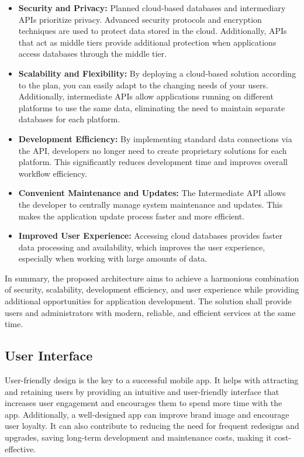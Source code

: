 \begin{itemize}
	\item \textbf{Security and Privacy:} Planned cloud-based databases and intermediary APIs prioritize privacy. Advanced security protocols and encryption techniques are used to protect data stored in the cloud. Additionally, APIs that act as middle tiers provide additional protection when applications access databases through the middle tier.
	
	\item \textbf{Scalability and Flexibility:} By deploying a cloud-based solution according to the  plan, you can easily adapt to the changing needs of your users.
	Additionally,  intermediate APIs allow applications running on different platforms to use the same data, eliminating the need to maintain separate databases for each platform.
	
	\item \textbf{Development Efficiency:} By implementing standard data connections via the  API,  developers no longer need to create proprietary solutions for each platform.
	This significantly reduces development time and improves overall workflow efficiency.
	
	\item \textbf{Convenient Maintenance and Updates:} The Intermediate API allows the developer to centrally manage system maintenance and updates. This makes the application update process faster and more efficient.
	
	\item \textbf{Improved User Experience:} Accessing cloud databases provides faster data processing and availability, which improves the user experience, especially when working with large amounts of data.
\end{itemize}
 
In summary, the proposed architecture aims to achieve a harmonious combination of security, scalability, development efficiency, and user experience while providing additional opportunities for application development. The solution shall provide users and administrators with modern, reliable, and efficient services at the same time.

\subsection{User Interface}

User-friendly design is the key to a successful mobile app. It helps with attracting and retaining users by providing an intuitive and user-friendly interface that increases user engagement and encourages them to spend more time with the app. Additionally, a well-designed app can improve brand image and encourage user loyalty. It can also contribute to reducing the need for frequent redesigns and upgrades, saving long-term development and maintenance costs, making it cost-effective. 

